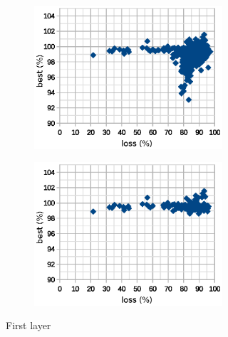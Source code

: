 \documentclass[12pt]{report}
\begin{document}
\begin{figure}[!ht]
\begin{subfigure}[b]{\linewidth}
		\begin{subfigure}[b]{0.49\linewidth}
			\centering
			\includegraphics[scale=0.7]{dia/all_first.eps}
		\end{subfigure}
		\begin{subfigure}[b]{0.49\linewidth}
			\centering
			\includegraphics[scale=0.7]{dia/best_first.eps}
		\end{subfigure}
		\caption{First layer}
	\end{subfigure}
	\begin{subfigure}[b]{\linewidth}
		\begin{subfigure}[b]{0.49\linewidth}
			\centering

\end{subfigure}
\end{subfigure}
\end{figure}
\end{document}
